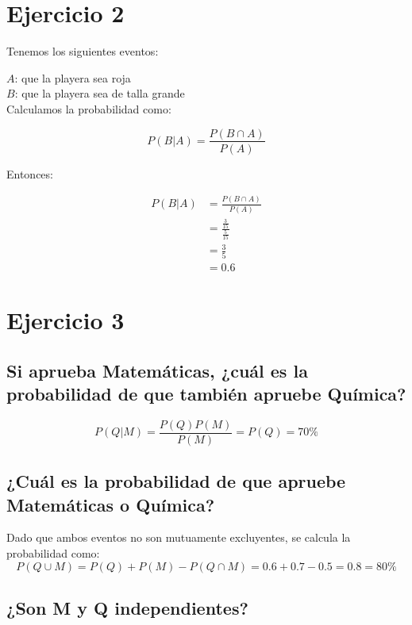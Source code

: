 \documentclass[letterpaper,12pt]{memoir}
\theoremstyle{definition}
\begin{document}
\section*{Ejercicio 2}

Tenemos los siguientes eventos:

\(A\): que la playera sea roja\\
\(B\): que la playera sea de talla grande\\


Calculamos la probabilidad como:

\begin{equation*}
  P(B|A) = \frac{P(B \cap A)}{P(A)}
\end{equation*}

Entonces:

\begin{align*}
  P(B|A) &= \frac{P(B \cap A)}{P(A)}\\
         &= \frac{\frac{3}{15}}{\frac{5}{15}}\\
         &= \frac{3}{5}\\
         &= 0.6
\end{align*}


\section*{Ejercicio 3}

\subsection*{Si aprueba Matemáticas, ¿cuál es la probabilidad de que también apruebe Química?}

\begin{equation*}
  P(Q|M) = \frac{P(Q)P(M)}{P(M)} = P(Q) = 70\%
\end{equation*}


\subsection*{¿Cuál es la probabilidad de que apruebe Matemáticas o Química?}
Dado que ambos eventos no son mutuamente excluyentes, se calcula la probabilidad como:
\begin{equation*}
  P(Q \cup M) = P(Q) + P(M) - P(Q \cap M)= 0.6 + 0.7 - 0.5 = 0.8 = 80\%
\end{equation*}

\subsection*{¿Son M y Q independientes?}
\end{document}

